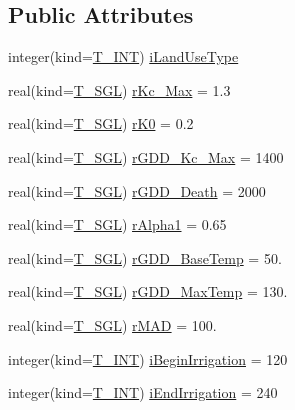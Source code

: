 \subsection*{Public Attributes}
\begin{DoxyCompactItemize}
\item 
integer(kind=\hyperlink{namespacetest_a6f91ebd89b58cfcc5da99faed9385c1e}{T\_\-INT}) \hyperlink{typetest_1_1_t___i_r_r_i_g_a_t_i_o_n___l_o_o_k_u_p_adbef98eaee47ddb9ab546dcab4527308}{iLandUseType}
\item 
real(kind=\hyperlink{namespacetest_a04d8b9090502de3a00046fe904bc3d99}{T\_\-SGL}) \hyperlink{typetest_1_1_t___i_r_r_i_g_a_t_i_o_n___l_o_o_k_u_p_a6088f666eae6835f54d34ab87b1b2091}{rKc\_\-Max} = 1.3
\item 
real(kind=\hyperlink{namespacetest_a04d8b9090502de3a00046fe904bc3d99}{T\_\-SGL}) \hyperlink{typetest_1_1_t___i_r_r_i_g_a_t_i_o_n___l_o_o_k_u_p_a9a020d19d59cfb1c70ede5f2585a96b9}{rK0} = 0.2
\item 
real(kind=\hyperlink{namespacetest_a04d8b9090502de3a00046fe904bc3d99}{T\_\-SGL}) \hyperlink{typetest_1_1_t___i_r_r_i_g_a_t_i_o_n___l_o_o_k_u_p_a5751f8a4d4700dd9b4f112a7d7281554}{rGDD\_\-Kc\_\-Max} = 1400
\item 
real(kind=\hyperlink{namespacetest_a04d8b9090502de3a00046fe904bc3d99}{T\_\-SGL}) \hyperlink{typetest_1_1_t___i_r_r_i_g_a_t_i_o_n___l_o_o_k_u_p_ad7f07fb9dff3499b6b708f9d8e6f7f53}{rGDD\_\-Death} = 2000
\item 
real(kind=\hyperlink{namespacetest_a04d8b9090502de3a00046fe904bc3d99}{T\_\-SGL}) \hyperlink{typetest_1_1_t___i_r_r_i_g_a_t_i_o_n___l_o_o_k_u_p_a6bb03e3c8350cf0504b69bd651ed7ddb}{rAlpha1} = 0.65
\item 
real(kind=\hyperlink{namespacetest_a04d8b9090502de3a00046fe904bc3d99}{T\_\-SGL}) \hyperlink{typetest_1_1_t___i_r_r_i_g_a_t_i_o_n___l_o_o_k_u_p_a10ac6c0415db9e72919d277e45694bf7}{rGDD\_\-BaseTemp} = 50.
\item 
real(kind=\hyperlink{namespacetest_a04d8b9090502de3a00046fe904bc3d99}{T\_\-SGL}) \hyperlink{typetest_1_1_t___i_r_r_i_g_a_t_i_o_n___l_o_o_k_u_p_a16e0ba91ffd650d0da0324c81fc015ed}{rGDD\_\-MaxTemp} = 130.
\item 
real(kind=\hyperlink{namespacetest_a04d8b9090502de3a00046fe904bc3d99}{T\_\-SGL}) \hyperlink{typetest_1_1_t___i_r_r_i_g_a_t_i_o_n___l_o_o_k_u_p_a835f1006468f43dbf4973538c87e609f}{rMAD} = 100.
\item 
integer(kind=\hyperlink{namespacetest_a6f91ebd89b58cfcc5da99faed9385c1e}{T\_\-INT}) \hyperlink{typetest_1_1_t___i_r_r_i_g_a_t_i_o_n___l_o_o_k_u_p_a5d80101947edb7f7e7649d7eb3ff6192}{iBeginIrrigation} = 120
\item 
integer(kind=\hyperlink{namespacetest_a6f91ebd89b58cfcc5da99faed9385c1e}{T\_\-INT}) \hyperlink{typetest_1_1_t___i_r_r_i_g_a_t_i_o_n___l_o_o_k_u_p_a684d0b67bfdaee841cc996b15ac6c1d2}{iEndIrrigation} = 240
\end{DoxyCompactItemize}


